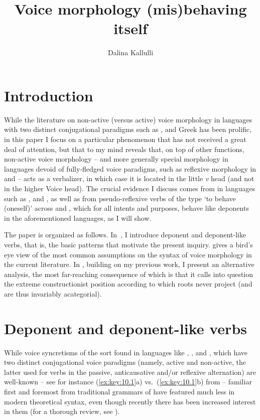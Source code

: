 \documentclass[output=paper]{langsci/langscibook}
\author{Dalina Kallulli\affiliation{University of Vienna}}
\title{Voice morphology (mis)behaving itself}
\begin{document}
\glsresetall
\maketitle

\section{Introduction}\label{sec:key:10.1}

While the literature on non-active (versus active) voice morphology in
languages with two distinct conjugational paradigms such as ,  and
Greek has been prolific, in this paper I focus on a particular phenomenon that
has not received a great deal of attention, but that to my mind reveals that,
on top of other functions, non-active voice morphology – and more generally
special morphology in languages devoid of fully-fledged voice paradigms, such
as reflexive morphology in  and  – acts as a verbalizer, in
which case it is located in the little \emph{v} head (and not in the higher
Voice head). The crucial evidence I discuss comes from  in
languages such as ,  and , as well as from pseudo-reflexive
verbs of the type ‘to behave (oneself)’ across  and , which for
all intents and purposes, behave like deponents in the aforementioned
languages, as I will show.

The paper is organized as follows. In~, I introduce deponent
and deponent-like verbs, that is, the basic patterns that motivate the present
inquiry.  gives a bird’s eye view of the most common
assumptions on the syntax of voice morphology in the current literature. In
, building on my previous work, I present an alternative
analysis, the most far-reaching consequence of which is that it calls into
question the extreme constructionist position according to which roots never
project (and are thus invariably acategorial).

\section{Deponent and deponent-like verbs}\label{sec:key:10.2}

While voice syncretisms of the sort found in languages like , ,
and , which have two distinct conjugational voice paradigms (namely,
active and non-active, the latter used for verbs in the passive, anticausative
and/or reflexive alternation) are well-known – see for instance (\ref{ex:key:10.1}a)
vs.\ (\ref{ex:key:10.1}b) from  –  familiar first and foremost
from traditional grammars of  have featured much less in modern
theoretical syntax, even though recently there has been increased interest in
them (for a thorough review, see \citealt{Grestenberger2014}).
\end{document}
